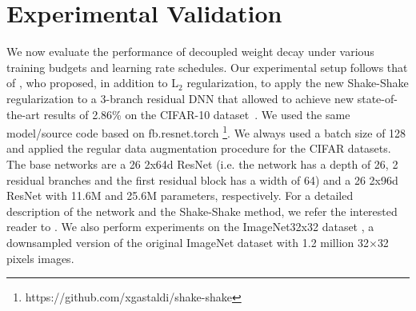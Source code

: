 \documentclass[usenames,dvipsnames]{article} %
\begin{document}
\section{Experimental Validation}



We now evaluate the performance of decoupled weight decay under various training budgets and learning rate schedules.
Our experimental setup follows that of \citet{gastaldi2017shake}, who proposed, in addition to L$_2$ regularization, to apply the new Shake-Shake regularization to a 3-branch residual DNN that allowed %
to achieve new state-of-the-art results of 2.86\% on the CIFAR-10 dataset~\citep{krizhevsky2009learning}.
We used the same model/source code based on fb.resnet.torch \footnote{https://github.com/xgastaldi/shake-shake}. 
We always used a batch size of 128 and applied 
the regular data augmentation procedure for the CIFAR datasets. 
The base networks are a 26 2x64d ResNet (i.e. the network has a depth of 26, 2 residual branches and the first residual block has a width of 64) and a 26 2x96d ResNet with 11.6M and 25.6M parameters, respectively. 
For a detailed description of the network and the Shake-Shake method, we refer the interested reader to \citet{gastaldi2017shake}. We also perform experiments on the ImageNet32x32 dataset \citep{chrabaszcz2017downsampled}, a downsampled version of the original ImageNet dataset with 1.2 million  32$\times$32 pixels images. 
\end{document}
